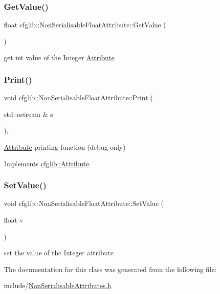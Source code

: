 \subsubsection{\texorpdfstring{Get\+Value()}{GetValue()}}
{\footnotesize\ttfamily float cfglib\+::\+Non\+Serialisable\+Float\+Attribute\+::\+Get\+Value (\begin{DoxyParamCaption}{ }\end{DoxyParamCaption})\hspace{0.3cm}{\ttfamily [inline]}}

get int value of the Integer \hyperlink{classcfglib_1_1Attribute}{Attribute} \mbox{\label{classcfglib_1_1NonSerialisableFloatAttribute_a507fc8e93b9ff7c56d483f2e51634e67}} 
\subsubsection{\texorpdfstring{Print()}{Print()}}
{\footnotesize\ttfamily void cfglib\+::\+Non\+Serialisable\+Float\+Attribute\+::\+Print (\begin{DoxyParamCaption}\item[{std\+::ostream \&}]{s }\end{DoxyParamCaption})\hspace{0.3cm}{\ttfamily [inline]}, {\ttfamily [virtual]}}

\hyperlink{classcfglib_1_1Attribute}{Attribute} printing function (debug only) 

Implements \hyperlink{classcfglib_1_1Attribute_af8d87ceddde146b92727e61823e0129b}{cfglib\+::\+Attribute}.

\mbox{\label{classcfglib_1_1NonSerialisableFloatAttribute_a68b000967be65bfa02626352476ca64e}} 
\subsubsection{\texorpdfstring{Set\+Value()}{SetValue()}}
{\footnotesize\ttfamily void cfglib\+::\+Non\+Serialisable\+Float\+Attribute\+::\+Set\+Value (\begin{DoxyParamCaption}\item[{float}]{v }\end{DoxyParamCaption})\hspace{0.3cm}{\ttfamily [inline]}}

set the value of the Integer attribute 

The documentation for this class was generated from the following file\+:\begin{DoxyCompactItemize}
\item 
include/\hyperlink{NonSerialisableAttributes_8h}{Non\+Serialisable\+Attributes.\+h}\end{DoxyCompactItemize}

